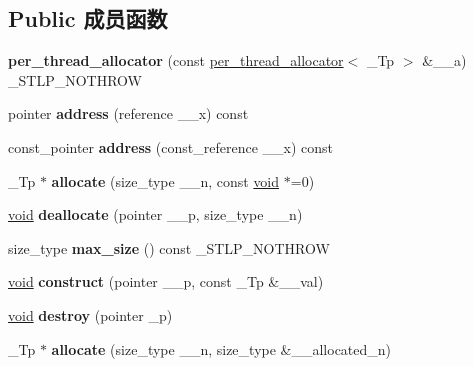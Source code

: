 \subsection*{Public 成员函数}
\begin{DoxyCompactItemize}
\item 
\mbox{\label{classper__thread__allocator_a036ad14fe5fb0abb1eb94cc15467bac3}} 
{\bfseries per\+\_\+thread\+\_\+allocator} (const \hyperlink{classper__thread__allocator}{per\+\_\+thread\+\_\+allocator}$<$ \+\_\+\+Tp $>$ \&\+\_\+\+\_\+a) \+\_\+\+S\+T\+L\+P\+\_\+\+N\+O\+T\+H\+R\+OW
\item 
\mbox{\label{classper__thread__allocator_a4a54498736084370e2c33a572e15b951}} 
pointer {\bfseries address} (reference \+\_\+\+\_\+x) const
\item 
\mbox{\label{classper__thread__allocator_a55423e2624fb93aa3f9f7c6b21b7b873}} 
const\+\_\+pointer {\bfseries address} (const\+\_\+reference \+\_\+\+\_\+x) const
\item 
\mbox{\label{classper__thread__allocator_a02c23ac798fc1dc0d54e71efd9b552da}} 
\+\_\+\+Tp $\ast$ {\bfseries allocate} (size\+\_\+type \+\_\+\+\_\+n, const \hyperlink{interfacevoid}{void} $\ast$=0)
\item 
\mbox{\label{classper__thread__allocator_aca5078b24c69f129dc3ae8f3de37222c}} 
\hyperlink{interfacevoid}{void} {\bfseries deallocate} (pointer \+\_\+\+\_\+p, size\+\_\+type \+\_\+\+\_\+n)
\item 
\mbox{\label{classper__thread__allocator_a2298872f2b0888fdc7ef381ed4e2f40e}} 
size\+\_\+type {\bfseries max\+\_\+size} () const \+\_\+\+S\+T\+L\+P\+\_\+\+N\+O\+T\+H\+R\+OW
\item 
\mbox{\label{classper__thread__allocator_a539fa241a926bbaade94eb83694ee0e8}} 
\hyperlink{interfacevoid}{void} {\bfseries construct} (pointer \+\_\+\+\_\+p, const \+\_\+\+Tp \&\+\_\+\+\_\+val)
\item 
\mbox{\label{classper__thread__allocator_a3465c74b2bb7508a93a214ab217e2034}} 
\hyperlink{interfacevoid}{void} {\bfseries destroy} (pointer \+\_\+p)
\item 
\mbox{\label{classper__thread__allocator_a3047ed0bba71a1bc06d589337267c3d2}} 
\+\_\+\+Tp $\ast$ {\bfseries allocate} (size\+\_\+type \+\_\+\+\_\+n, size\+\_\+type \&\+\_\+\+\_\+allocated\+\_\+n)
\end{DoxyCompactItemize}
